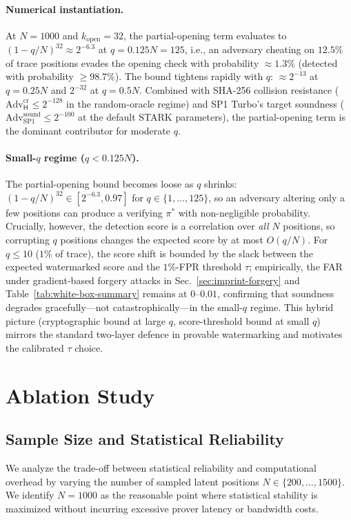 \documentclass{article}
\theoremstyle{plain}
\theoremstyle{definition}
\theoremstyle{remark}
\begin{document}
\paragraph{Numerical instantiation.} At $N=1000$ and $k_{\mathrm{open}}=32$, the partial-opening term evaluates to $(1 - q/N)^{32} \approx 2^{-6.3}$ at $q = 0.125 N = 125$, i.e., an adversary cheating on $12.5\%$ of trace positions evades the opening check with probability ${\approx}1.3\%$ (detected with probability ${\geq}98.7\%$). The bound tightens rapidly with $q$: ${\approx}2^{-13}$ at $q{=}0.25 N$ and $2^{-32}$ at $q{=}0.5 N$. Combined with SHA-256 collision resistance ($\mathrm{Adv}^{\mathrm{cr}}_{\mathsf{H}} \leq 2^{-128}$ in the random-oracle regime) and SP1 Turbo's target soundness ($\mathrm{Adv}^{\mathrm{sound}}_{\mathrm{SP1}} \leq 2^{-100}$ at the default STARK parameters), the partial-opening term is the dominant contributor for moderate $q$.

\paragraph{Small-$q$ regime ($q < 0.125 N$).} The partial-opening bound becomes loose as $q$ shrinks: $(1 - q/N)^{32} \in [2^{-6.3}, 0.97]$ for $q \in \{1, \dots, 125\}$, so an adversary altering only a few positions can produce a verifying $\pi^*$ with non-negligible probability. Crucially, however, the detection score is a correlation over \emph{all} $N$ positions, so corrupting $q$ positions changes the expected score by at most $O(q/N)$. For $q \leq 10$ ($1\%$ of trace), the score shift is bounded by the slack between the expected watermarked score and the $1\%$-FPR threshold $\tau$; empirically, the FAR under gradient-based forgery attacks in Sec.~\ref{sec:imprint-forgery} and Table~\ref{tab:white-box-summary} remains at $0$--$0.01$, confirming that soundness degrades gracefully---not catastrophically---in the small-$q$ regime. This hybrid picture (cryptographic bound at large $q$, score-threshold bound at small $q$) mirrors the standard two-layer defence in provable watermarking and motivates the calibrated $\tau$ choice.

\section{Ablation Study}
\subsection{Sample Size and Statistical Reliability}
We analyze the trade-off between statistical reliability and computational overhead by varying the number of sampled latent positions $N \in \{200, \dots, 1500\}$. We identify $N=1000$ as the reasonable point where statistical stability is maximized without incurring excessive prover latency or bandwidth costs.
\end{document}
